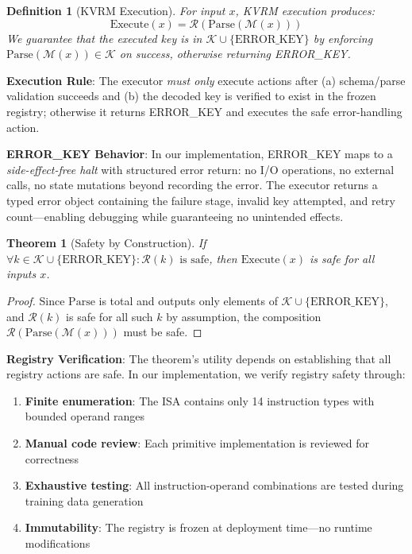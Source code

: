 \documentclass[11pt,a4paper]{article}
\newtheorem{definition}{Definition}
\newtheorem{theorem}{Theorem}
\begin{document}
\begin{definition}[KVRM Execution]
For input $x$, KVRM execution produces:
\begin{equation}
\text{Execute}(x) = \mathcal{R}(\text{Parse}(\mathcal{M}(x)))
\end{equation}
We guarantee that the executed key is in $\mathcal{K} \cup \{\text{ERROR\_KEY}\}$ by enforcing $\text{Parse}(\mathcal{M}(x)) \in \mathcal{K}$ on success, otherwise returning ERROR\_KEY.
\end{definition}

\textbf{Execution Rule}: The executor \textit{must only} execute actions after (a) schema/parse validation succeeds and (b) the decoded key is verified to exist in the frozen registry; otherwise it returns ERROR\_KEY and executes the safe error-handling action.

\textbf{ERROR\_KEY Behavior}: In our implementation, ERROR\_KEY maps to a \textit{side-effect-free halt} with structured error return: no I/O operations, no external calls, no state mutations beyond recording the error. The executor returns a typed error object containing the failure stage, invalid key attempted, and retry count---enabling debugging while guaranteeing no unintended effects.

\begin{theorem}[Safety by Construction]
If $\forall k \in \mathcal{K} \cup \{\text{ERROR\_KEY}\}: \mathcal{R}(k) \text{ is safe}$, then $\text{Execute}(x)$ is safe for all inputs $x$.
\end{theorem}

\begin{proof}
Since $\text{Parse}$ is total and outputs only elements of $\mathcal{K} \cup \{\text{ERROR\_KEY}\}$, and $\mathcal{R}(k)$ is safe for all such $k$ by assumption, the composition $\mathcal{R}(\text{Parse}(\mathcal{M}(x)))$ must be safe.
\end{proof}

\textbf{Registry Verification}: The theorem's utility depends on establishing that all registry actions are safe. In our implementation, we verify registry safety through:
\begin{enumerate}
    \item \textbf{Finite enumeration}: The ISA contains only 14 instruction types with bounded operand ranges
    \item \textbf{Manual code review}: Each primitive implementation is reviewed for correctness
    \item \textbf{Exhaustive testing}: All instruction-operand combinations are tested during training data generation
    \item \textbf{Immutability}: The registry is frozen at deployment time---no runtime modifications
\end{enumerate}
\end{document}
